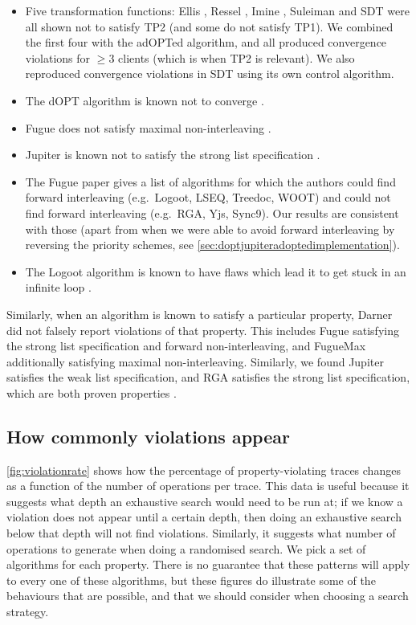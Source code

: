 \documentclass[sigplan,10pt,review,anonymous]{acmart}
\begin{document}
\begin{itemize}
  \item
    Five transformation functions: Ellis \cite{Ellis1989}, Ressel \cite{Ressel1996}, Imine \cite{Imine2003}, Suleiman \cite{Suleiman1997} and SDT \cite{Li2008} were all shown not to satisfy TP2 \cite{Oster2005Proving} (and some do not satisfy TP1). We combined the first four with the adOPTed algorithm, and all produced convergence violations for $\ge 3$ clients (which is when TP2 is relevant). We also reproduced convergence violations in SDT using its own control algorithm.
  \item
    The dOPT algorithm is known not to converge \cite{Sun1996}.
  \item
    Fugue does not satisfy maximal non-interleaving \cite{Weidner2025Fugue}.
  \item
    Jupiter is known not to satisfy the strong list specification \cite{Attiya2016}.
  \item
    The Fugue paper \cite{Weidner2025Fugue} gives a list of algorithms for which the authors could find forward interleaving (e.g.\ Logoot, LSEQ, Treedoc, WOOT) and could not find forward interleaving (e.g.\ RGA, Yjs, Sync9). Our results are consistent with those (apart from when we were able to avoid forward interleaving by reversing the priority schemes, see \autoref{sec:doptjupiteradoptedimplementation}). 
  \item
    The Logoot algorithm is known to have flaws which lead it to get stuck in an infinite loop \cite{Sun2018}.
\end{itemize}


Similarly, when an algorithm is known to satisfy a particular property, Darner did not falsely report violations of that property. This includes Fugue \cite{Weidner2025Fugue} satisfying the strong list specification and forward non-interleaving, and FugueMax additionally satisfying maximal non-interleaving. Similarly, we found Jupiter satisfies the weak list specification, and RGA satisfies the strong list specification, which are both proven properties \cite{Wei2018, Attiya2016}.  


\subsection{How commonly violations appear}

\autoref{fig:violationrate} shows how the percentage of property-violating traces changes as a function of the number of operations per trace. This data is useful because it suggests what depth an exhaustive search would need to be run at; if we know a violation does not appear until a certain depth, then doing an exhaustive search below that depth will not find violations. Similarly, it suggests what number of operations to generate when doing a randomised search. We pick a set of algorithms for each property. There is no guarantee that these patterns will apply to every one of these algorithms, but these figures do illustrate some of the behaviours that are possible, and that we should consider when choosing a search strategy.
\end{document}
